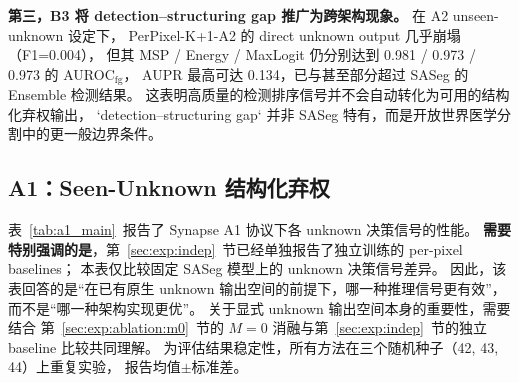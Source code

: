 \documentclass[3p,twocolumn,authoryear]{elsarticle}
\begin{document}
\textbf{第三，B3 将 detection--structuring gap 推广为跨架构现象。}
在 A2 unseen-unknown 设定下，
PerPixel-K+1-A2 的 direct unknown output 几乎崩塌（F1=0.004），
但其 MSP / Energy / MaxLogit 仍分别达到 0.981 / 0.973 / 0.973 的 AUROC$_{\text{fg}}$，
AUPR 最高可达 0.134，已与甚至部分超过 SASeg 的 Ensemble 检测结果。
这表明高质量的检测排序信号并不会自动转化为可用的结构化弃权输出，
`detection--structuring gap` 并非 SASeg 特有，而是开放世界医学分割中的更一般边界条件。

\subsection{A1：Seen-Unknown 结构化弃权}\label{sec:exp:a1}

表~\ref{tab:a1_main}~报告了 Synapse A1 协议下各 unknown 决策信号的性能。
\textbf{需要特别强调的是}，第~\ref{sec:exp:indep}~节已经单独报告了独立训练的 per-pixel baselines；
本表仅比较固定 SASeg 模型上的 unknown 决策信号差异。
因此，该表回答的是“在已有原生 unknown 输出空间的前提下，哪一种推理信号更有效”，
而不是“哪一种架构实现更优”。
关于显式 unknown 输出空间本身的重要性，需要结合
第~\ref{sec:exp:ablation:m0}~节的 $M=0$ 消融与第~\ref{sec:exp:indep}~节的独立 baseline 比较共同理解。
为评估结果稳定性，所有方法在三个随机种子（42, 43, 44）上重复实验，
报告均值$\pm$标准差。

\begin{table}[t]
\centering
\caption{Synapse A1 协议下不同 unknown 决策信号的比较。
所有方法共用同一训练模型（$M=2$），仅替换 unknown 判定信号。
报告三种子均值$\pm$标准差。}\label{tab:a1_main}
\footnotesize
\setlength{\tabcolsep}{3pt}
\end{table}
\end{document}
